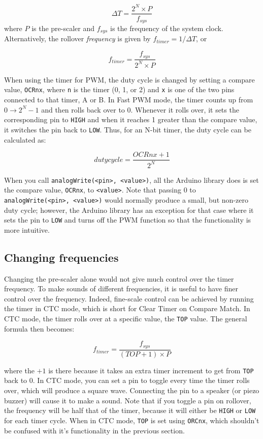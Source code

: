 \documentclass[11pt]{article} %
\begin{document}
\[
\Delta T = \frac{2^N \times P}{f_{sys}}
\]
where $P$ is the pre-scaler and $f_{sys}$ is the frequency of the system clock. Alternatively, the rollover \emph{frequency} is given by $f_{timer} = 1/\Delta T$, or

\begin{equation}
f_{timer} = \frac{f_{sys}}{2^N \times P}
\label{eq:freq}
\end{equation}

When using the timer for PWM, the duty cycle is changed by setting a compare value, \verb|OCRnx|, where \verb|n| is the timer (0, 1, or 2) and \verb|x| is one of the two pins connected to that timer, A or B. In Fast PWM mode, the timer counts up from $0 \rightarrow 2^N-1$ and then rolls back over to $0$. Whenever it rolls over, it sets the corresponding pin to \verb|HIGH| and when it reaches 1 greater than the compare value, it switches the pin back to \verb|LOW|. Thus, for an N-bit timer, the duty cycle can be calculated as:

\begin{equation}
duty cycle= \frac{OCRnx + 1}{2^N}
\label{eq:duty.cycle}
\end{equation}

When you call \verb|analogWrite(<pin>, <value>)|, all the Arduino library does is set the compare value, \verb|OCRnx|, to \verb|<value>|. Note that passing 0 to \verb|analogWrite(<pin>, <value>)| would normally produce a small, but non-zero duty cycle; however, the Arduino library has an exception for that case where it sets the pin to \verb|LOW| and turns off the PWM function so that the functionality is more intuitive.

\subsection{Changing frequencies}

Changing the pre-scaler alone would not give much control over the timer frequency. To make sounds of different frequencies, it is useful to have finer control over the frequency. Indeed, fine-scale control can be achieved by running the timer in CTC mode, which is short for Clear Timer on Compare Match. In CTC mode, the timer rolls over at a specific value, the \verb|TOP| value. The general formula then becomes:

\[
f_{timer} = \frac{f_{sys}}{(TOP + 1) \times P}
\label{eq:top}
\]

where the $+1$ is there because it takes an extra timer increment to get from \verb|TOP| back to 0. In CTC mode, you can set a pin to toggle every time the timer rolls over, which will produce a square wave. Connecting the pin to a speaker (or piezo buzzer) will cause it to make a sound. Note that if you toggle a pin on rollover, the frequency will be half that of the timer, because it will either be \verb|HIGH| or \verb|LOW| for each timer cycle. When in CTC mode, \verb|TOP| is set using \verb|ORCnx|, which shouldn’t be confused with it’s functionality in the previous section.
\end{document}
